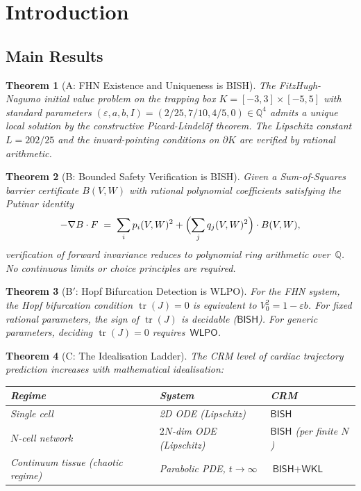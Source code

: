 \documentclass[11pt,a4paper]{article}
\theoremstyle{plain}
\newtheorem{theorem}{Theorem}[section]
\theoremstyle{definition}
\newcommand{\BISH}{\textsf{BISH}}
\newcommand{\WKL}{\textsf{WKL}}
\newcommand{\WLPO}{\textsf{WLPO}}
\newcommand{\Q}{\mathbb{Q}}
\begin{document}
\section{Introduction}\label{sec:intro}

\subsection{Main Results}

\begin{theorem}[A: FHN Existence and Uniqueness is BISH]\label{thm:A}
The FitzHugh-Nagumo initial value problem on the trapping box $K = [-3,3] \times [-5,5]$ with standard parameters $(\varepsilon, a, b, I) = (2/25, 7/10, 4/5, 0) \in \Q^4$ admits a unique local solution by the constructive Picard-Lindel\"of theorem.  The Lipschitz constant $L = 202/25$ and the inward-pointing conditions on $\partial K$ are verified by rational arithmetic.
\end{theorem}

\begin{theorem}[B: Bounded Safety Verification is BISH]\label{thm:B}
Given a Sum-of-Squares barrier certificate $B(V,W)$ with rational polynomial coefficients satisfying the Putinar identity
\[
  -\nabla B \cdot F \;=\; \sum_i p_i(V,W)^2 + \Bigl(\sum_j q_j(V,W)^2\Bigr) \cdot B(V,W),
\]
verification of forward invariance reduces to polynomial ring arithmetic over~$\Q$.  No continuous limits or choice principles are required.
\end{theorem}

\begin{theorem}[B$'$: Hopf Bifurcation Detection is WLPO]\label{thm:Bprime}
For the FHN system, the Hopf bifurcation condition $\operatorname{tr}(J) = 0$ is equivalent to $V_0^2 = 1 - \varepsilon b$.  For fixed rational parameters, the sign of $\operatorname{tr}(J)$ is decidable ($\BISH$).  For generic parameters, deciding $\operatorname{tr}(J) = 0$ requires~$\WLPO$.
\end{theorem}

\begin{theorem}[C: The Idealisation Ladder]\label{thm:C}
The CRM level of cardiac trajectory prediction increases with mathematical idealisation:
\begin{center}
\begin{tabular}{lll}
\toprule
\textbf{Regime} & \textbf{System} & \textbf{CRM} \\
\midrule
Single cell & 2D ODE (Lipschitz) & $\BISH$ \\
$N$-cell network & $2N$-dim ODE (Lipschitz) & $\BISH$ (per finite $N$) \\
Continuum tissue (chaotic regime) & Parabolic PDE, $t \to \infty$ & $\BISH + \WKL$ \\
\bottomrule
\end{tabular}
\end{center}
\end{theorem}
\end{document}
